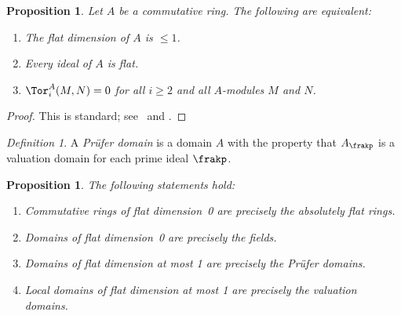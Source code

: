 \documentclass{amsart}
\numberwithin{equation}{section}%
\newtheorem{Prop}[equation]{Proposition}
\theoremstyle{remark}
\newtheorem{Def}[equation]{Definition}
\newcounter{enum-resume-hack}
\begin{document}
\begin{Prop}\label{prop:fd-le-1}
	Let $A$ be a commutative ring. The following are equivalent:
	\begin{enumerate}
		\item The flat dimension of $A$ is $\le 1$.
		\item Every ideal of $A$ is flat.
		\item $\Tor_i^A(M,N) = 0$ for all $i \ge 2$ and all $A$-modules $M$ and $N$.
	\end{enumerate}
\end{Prop}

\begin{proof}
	This is standard; see~\cite[Lemma~4.66]{Lam99} and \cite[Proposition~8.17]{Rotman09}.
\end{proof}

\begin{Def}
	A \emph{Pr\"{u}fer domain} is a domain $A$ with the property that $A_{\frakp}$ is a valuation domain for each prime ideal $\frakp$.
\end{Def}

\begin{Prop}\label{prop:fd-examples} The following statements hold:
	\begin{enumerate}
		\item Commutative rings of flat dimension~0 are precisely the absolutely flat rings.
		\item Domains of flat dimension~0 are precisely the fields.
		\item Domains of flat dimension at most 1 are precisely the Pr\"{u}fer domains.
		\item Local domains of flat dimension at most 1 are precisely the valuation domains.
	\end{enumerate}
\end{Prop}
\end{document}

